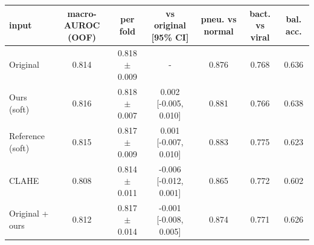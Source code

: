 \begin{tabular}{lcccccc}
\toprule
input & macro-AUROC (OOF) & per fold & vs original [95\% CI] & pneu. vs normal & bact. vs viral & bal. acc. \\
\midrule
Original & 0.814 & 0.818 $\pm$ 0.009 & - & 0.876 & 0.768 & 0.636 \\
Ours (soft) & 0.816 & 0.818 $\pm$ 0.007 & 0.002 [-0.005, 0.010] & 0.881 & 0.766 & 0.638 \\
Reference (soft) & 0.815 & 0.817 $\pm$ 0.009 & 0.001 [-0.007, 0.010] & 0.883 & 0.775 & 0.623 \\
CLAHE & 0.808 & 0.814 $\pm$ 0.011 & -0.006 [-0.012, 0.001] & 0.865 & 0.772 & 0.602 \\
Original + ours & 0.812 & 0.817 $\pm$ 0.014 & -0.001 [-0.008, 0.005] & 0.874 & 0.771 & 0.626 \\
\bottomrule
\end{tabular}
